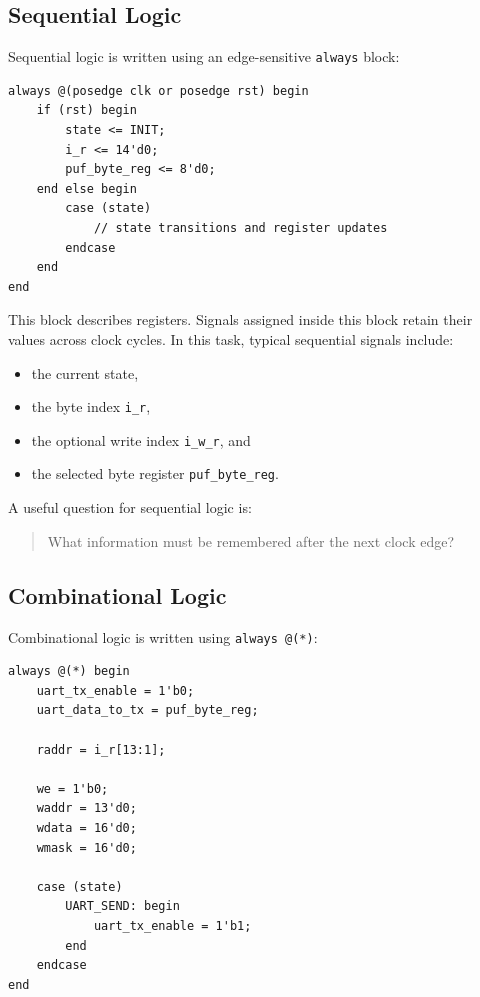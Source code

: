 \documentclass[11pt,a4paper]{article}
\begin{document}
\subsection{Sequential Logic}

Sequential logic is written using an edge-sensitive \texttt{always} block:

\begin{lstlisting}
always @(posedge clk or posedge rst) begin
    if (rst) begin
        state <= INIT;
        i_r <= 14'd0;
        puf_byte_reg <= 8'd0;
    end else begin
        case (state)
            // state transitions and register updates
        endcase
    end
end
\end{lstlisting}

This block describes registers. Signals assigned inside this block retain their values across clock cycles. In this task, typical sequential signals include:

\begin{itemize}
  \item the current state,
  \item the byte index \texttt{i\_r},
  \item the optional write index \texttt{i\_w\_r}, and
  \item the selected byte register \texttt{puf\_byte\_reg}.
\end{itemize}

A useful question for sequential logic is:

\begin{quote}
What information must be remembered after the next clock edge?
\end{quote}

\subsection{Combinational Logic}

Combinational logic is written using \texttt{always @(*)}:

\begin{lstlisting}
always @(*) begin
    uart_tx_enable = 1'b0;
    uart_data_to_tx = puf_byte_reg;

    raddr = i_r[13:1];

    we = 1'b0;
    waddr = 13'd0;
    wdata = 16'd0;
    wmask = 16'd0;

    case (state)
        UART_SEND: begin
            uart_tx_enable = 1'b1;
        end
    endcase
end
\end{lstlisting}
\end{document}
